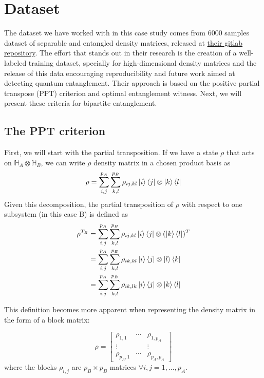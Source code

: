 \section{Dataset}

The dataset we have worked with in this case study comes from \cite{casale2023large} 6000 samples dataset of separable and entangled density matrices, released at \href{https://gitlab.lis-lab.fr/balthazar.casale/ML-Quant-Sep}{their gitlab repository}. The effort that stands out in their research is the creation of a well-labeled training dataset, specially for high-dimensional density matrices and the release of this data encouraging reproducibility and future work aimed at detecting quantum entanglement. Their approach is based on the positive partial transpose (PPT) criterion and optimal entanglement witness. Next, we will present these criteria for bipartite entanglement.

\subsection{The PPT criterion}

First, we will start with the partial transposition. If we have a state $\rho$ that acts on $\mathbb{H}_A \otimes \mathbb{H}_B$, we can write $\rho$ density matrix in a chosen product basis as 
\begin{equation}
    \rho = \sum_{i,j}^{p_A} \sum_{k,l}^{p_B} \rho_{ij, kl} \ket{i}\bra{j} \otimes \ket{k}\bra{l}
\end{equation}
Given this decomposition, the partial transposition of $\rho$ with respect to one subsystem (in this case B) is defined as 
\begin{align}
    \rho^{T_B} &=\sum_{i,j}^{p_A} \sum_{k,l}^{p_B} \rho_{ij,kl} \ket{i}\bra{j} \otimes ( \ket{k} \bra{l})^T \\
    &= \sum_{i,j}^{p_A} \sum_{k,l}^{p_B} \rho_{ik, kl} \ket{i}\bra{j} \otimes \ket{l} \bra{k} \\
    &= \sum_{i,j}^{p_A} \sum_{k,l}^{p_B} \rho_{ik, lk} \ket{i}\bra{j} \otimes \ket{k} \bra{l}
\end{align}

This definition becomes more apparent when representing the density matrix in the form of a block matrix:

\begin{equation}
    \rho = \begin{bmatrix}
        \rho_{1,1}& \cdots & \rho_{1,p_A}\\
        \vdots & & \vdots\\
        \rho_{p_A,1} & \cdots & \rho_{p_A,p_A}
        \end{bmatrix} 
\end{equation}
where the blocks $\rho_{i,j}$ are $p_B \times p_B$ matrices $\forall i,j =1, ..., p_A$.

